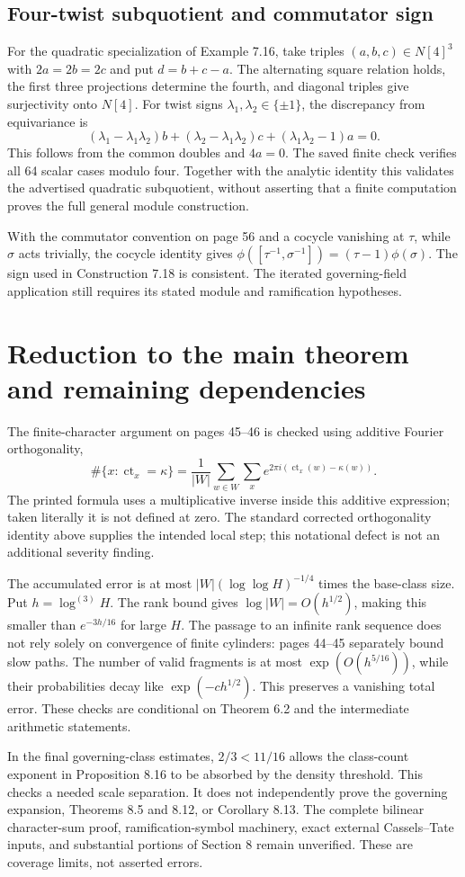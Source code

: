 \documentclass[10pt]{article}
\begin{document}
\subsection*{Four-twist subquotient and commutator sign}
For the quadratic specialization of Example 7.16, take triples \((a,b,c)\in N[4]^3\) with \(2a=2b=2c\) and put \(d=b+c-a\). The alternating square relation holds, the first three projections determine the fourth, and diagonal triples give surjectivity onto \(N[4]\). For twist signs \(\lambda_1,\lambda_2\in\{\pm1\}\), the discrepancy from equivariance is \[(\lambda_1-\lambda_1\lambda_2)b+
 (\lambda_2-\lambda_1\lambda_2)c+
 (\lambda_1\lambda_2-1)a=0.\] This follows from the common doubles and \(4a=0\). The saved finite check verifies all 64 scalar cases modulo four. Together with the analytic identity this validates the advertised quadratic subquotient, without asserting that a finite computation proves the full general module construction.\par
With the commutator convention on page 56 and a cocycle vanishing at \(\tau\), while \(\sigma\) acts trivially, the cocycle identity gives \(\phi([\tau^{-1},\sigma^{-1}])=(\tau-1)\phi(\sigma)\). The sign used in Construction 7.18 is consistent. The iterated governing-field application still requires its stated module and ramification hypotheses.\par
\section*{Reduction to the main theorem and remaining dependencies}
The finite-character argument on pages 45–46 is checked using additive Fourier orthogonality, \[\#\{x:\operatorname{ct}_x=\kappa\}
 =\frac1{|W|}\sum_{w\in W}\sum_x
 e^{2\pi i(\operatorname{ct}_x(w)-\kappa(w))}.\] The printed formula uses a multiplicative inverse inside this additive expression; taken literally it is not defined at zero. The standard corrected orthogonality identity above supplies the intended local step; this notational defect is not an additional severity finding.\par
The accumulated error is at most \(|W|(\log\log H)^{-1/4}\) times the base-class size. Put \(h=\log^{(3)}H\). The rank bound gives \(\log|W|=O(h^{1/2})\), making this smaller than \(e^{-3h/16}\) for large \(H\). The passage to an infinite rank sequence does not rely solely on convergence of finite cylinders: pages 44–45 separately bound slow paths. The number of valid fragments is at most \(\exp(O(h^{5/16}))\), while their probabilities decay like \(\exp(-c h^{1/2})\). This preserves a vanishing total error. These checks are conditional on Theorem 6.2 and the intermediate arithmetic statements.\par
In the final governing-class estimates, \(2/3<11/16\) allows the class-count exponent in Proposition 8.16 to be absorbed by the density threshold. This checks a needed scale separation. It does not independently prove the governing expansion, Theorems 8.5 and 8.12, or Corollary 8.13. The complete bilinear character-sum proof, ramification-symbol machinery, exact external Cassels–Tate inputs, and substantial portions of Section 8 remain unverified. These are coverage limits, not asserted errors.\par
\end{document}

